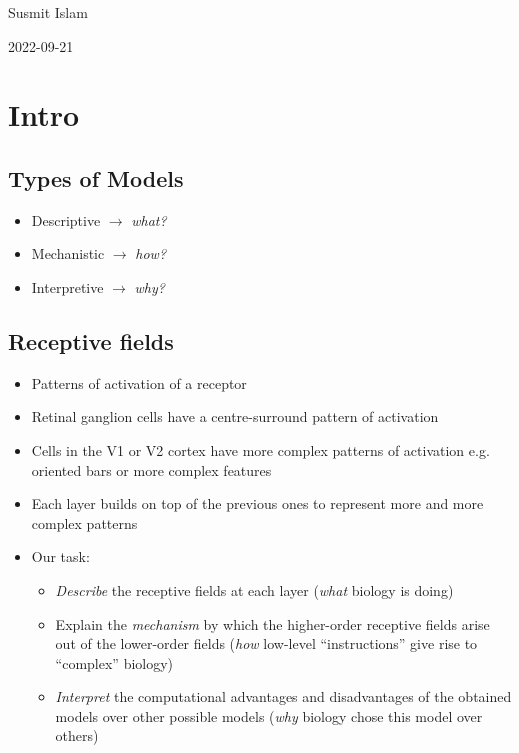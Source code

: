 \documentclass[
  12pt,
]{memoir}
\providecommand{\tightlist}{%
  \setlength{\itemsep}{0pt}\setlength{\parskip}{0pt}}
\begin{document}
\hfill Susmit Islam

\hfill 2022-09-21

\hypertarget{intro}{%
\chapter{Intro}\label{intro}}

\hypertarget{types-of-models}{%
\section{Types of Models}\label{types-of-models}}

\begin{itemize}
\tightlist
\item
  Descriptive \(\rightarrow\) \emph{what?}
\item
  Mechanistic \(\rightarrow\) \emph{how?}
\item
  Interpretive \(\rightarrow\) \emph{why?}
\end{itemize}

\hypertarget{receptive-fields}{%
\section{Receptive fields}\label{receptive-fields}}

\begin{itemize}
\tightlist
\item
  Patterns of activation of a receptor
\item
  Retinal ganglion cells have a centre-surround pattern of activation
\item
  Cells in the V1 or V2 cortex have more complex patterns of activation
  e.g. oriented bars or more complex features
\item
  Each layer builds on top of the previous ones to represent more and
  more complex patterns
\item
  Our task:

  \begin{itemize}
  \tightlist
  \item
    \emph{Describe} the receptive fields at each layer (\emph{what}
    biology is doing)
  \item
    Explain the \emph{mechanism} by which the higher-order receptive
    fields arise out of the lower-order fields (\emph{how} low-level
    ``instructions'' give rise to ``complex'' biology)
  \item
    \emph{Interpret} the computational advantages and disadvantages of
    the obtained models over other possible models (\emph{why} biology
    chose this model over others)
  \end{itemize}
\end{itemize}

\backmatter
\end{document}
